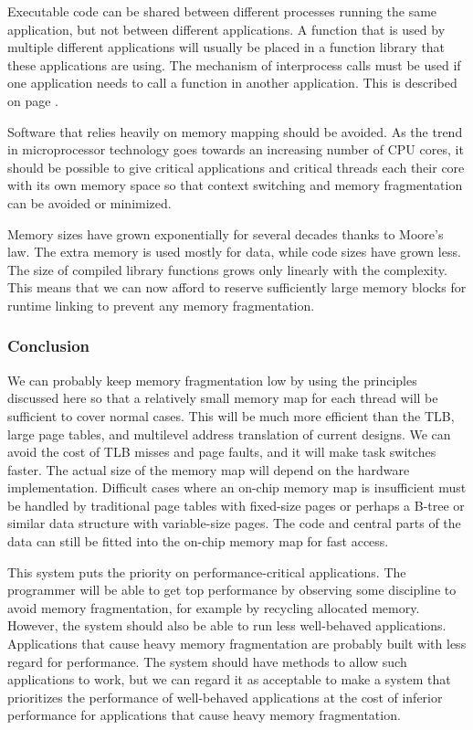 \documentclass[forwardcom.tex]{subfiles}
\begin{document}
Executable code can be shared between different processes running the same application, but not between different applications. A function that is used by multiple different applications will usually be placed in a function library that these applications are using. 
The mechanism of interprocess calls must be used if one application needs to call a function in another application. This is described on page \pageref{interProcessCalls}. 
\vv

Software that relies heavily on memory mapping should be avoided. As the trend in microprocessor technology goes towards an increasing number of CPU cores, it should be possible to give critical applications and critical threads each their core with its own memory space so that context switching and memory fragmentation can be avoided or minimized.
\vv

Memory sizes have grown exponentially for several decades thanks to Moore's law. 
The extra memory is used mostly for data, while code sizes have grown less. The size of compiled library functions grows only linearly with the complexity. This means that we can now afford to reserve sufficiently large memory blocks for runtime linking to prevent any memory fragmentation.
\vv


\subsubsection{Conclusion} \label{MemoryManagementConclusion}
We can probably keep memory fragmentation low by using the principles discussed here so that a relatively small memory map for each thread will be sufficient to cover normal cases. This will be much more efficient than the TLB, large page tables, and multilevel address translation of current designs. 
We can avoid the cost of TLB misses and page faults, and it will make task switches faster. The actual size of the memory map will depend on the hardware implementation. 
Difficult cases where an on-chip memory map is insufficient must be handled by traditional page tables with fixed-size pages or perhaps a B-tree or similar data structure with variable-size pages. The code and 
central parts of the data can still be fitted into the on-chip memory map for fast access.
\vv

This system puts the priority on performance-critical applications. The programmer will be able to get top performance by observing some discipline to avoid memory fragmentation, for example by recycling allocated memory. However, the system should also be able to run less well-behaved applications. Applications that cause heavy memory fragmentation are probably built with less regard for performance. The system should have methods to allow such applications to work, but we can regard it as acceptable to make a system that prioritizes the performance of well-behaved applications at the cost of inferior performance for applications that cause heavy memory fragmentation.
\end{document}
